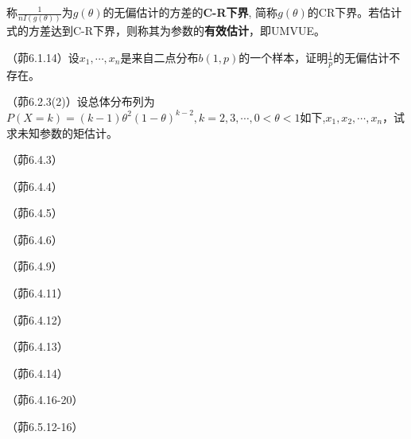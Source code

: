 \begin{definition}[CR下界]
    称$\frac1{n I(g(\theta))}$为$g(\theta)$的无偏估计的方差的\textbf{C-R下界}, 简称$g(\theta)$的CR下界。若估计式的方差达到C-R下界，则称其为参数的\textbf{有效估计}，即UMVUE。
\end{definition}



\begin{problemset}[错题记录]
    \item （茆6.1.14）设$x_1,\cdots ,x_n$是来自二点分布$b(1,p)$的一个样本，证明$\frac{1}{p}$的无偏估计不存在。
    \item （茆6.2.3(2)）设总体分布列为$P(X=k)=(k-1) \theta^{2}(1-\theta)^{k-2}, k=2,3, \cdots, 0<\theta<1$如下,$x_1,x_2,\cdots,x_n$，试求未知参数的矩估计。
    \item （茆6.4.3）
    \item （茆6.4.4）
    \item （茆6.4.5）
    \item （茆6.4.6）
    \item （茆6.4.9）
    \item （茆6.4.11）
    \item （茆6.4.12）
    \item （茆6.4.13）
    \item （茆6.4.14）
    \item （茆6.4.16-20）
    \item （茆6.5.12-16）
\end{problemset}